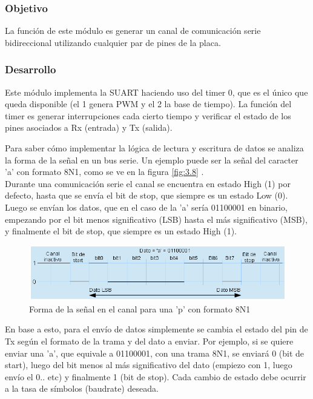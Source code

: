 \subsubsection{Objetivo}
La función de este módulo es generar un canal de comunicación serie bidireccional utilizando cualquier par de pines de la placa.

\subsubsection{Desarrollo}
Este módulo implementa la SUART haciendo uso del timer 0, que es el único que queda disponible (el 1 genera PWM y el 2 la base de tiempo). La función del timer es generar interrupciones cada cierto tiempo y verificar el estado de los pines asociados a Rx (entrada) y Tx (salida). 

Para saber cómo implementar la lógica de lectura y escritura de datos se analiza la forma de la señal en un bus serie. Un ejemplo puede ser la señal del caracter 'a' con formato 8N1, como se ve en la figura  \ref{fig:3.8} . \\
Durante una comunicación serie el canal se encuentra en estado High (1) por defecto, hasta que se envía el bit de stop, que siempre es un estado Low (0). Luego se envían los datos, que en el caso de la 'a' sería 01100001 en binario, empezando por el bit menos significativo (LSB) hasta el más significativo (MSB), y finalmente el bit de stop, que siempre es un estado High (1). \\

\begin{figure}[!ht]
	\centering
	\includegraphics[width=16cm,scale=1]{resources/3_8-datoSerie.png}
	\caption{Forma de la señal en el canal para una 'p' con formato 8N1}
	\label{fig:\thefigure}
\end{figure}


En base a esto, para el envío de datos simplemente se cambia el estado del pin de Tx según el formato de la trama y del dato a enviar. Por ejemplo, si se quiere enviar una 'a', que equivale a 01100001, con una trama 8N1, se enviará 0 (bit de start), luego del bit menos al más significativo del dato (empiezo con 1, luego envío el 0.. etc) y finalmente 1 (bit de stop). Cada cambio de estado debe ocurrir a la tasa de símbolos (baudrate) deseada.

